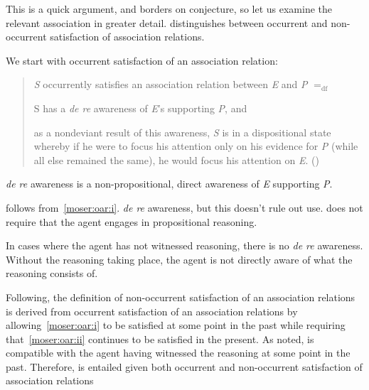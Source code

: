 \begin{note}
  This is a quick argument, and borders on conjecture, so let us examine the relevant association in greater detail.
  \citeauthor{Moser:1989tv} distinguishes between occurrent and non-occurrent satisfaction of association relations.

  We start with occurrent satisfaction of an association relation:
  \begin{quote}
    \emph{S} occurrently satisfies an association relation between \emph{E} and \emph{P} \(=_{\text{df}}\)
    \begin{enumerate*}[label=(\roman*), ref=(\roman*)]
    \item\label{moser:oar:i} S has a \emph{de re} awareness of \emph{E}'s supporting \emph{P}, and
    \item\label{moser:oar:ii} as a nondeviant result of this awareness, \emph{S} is in a dispositional state whereby if he were to focus his attention only on his evidence for \emph{P} (while all else remained the same), he would focus his attention on \emph{E}.\newline
    \mbox{}\hfill\mbox{(\Citeyear[141--142]{Moser:1989tv})}
    \end{enumerate*}
  \end{quote}

  \emph{de re} awareness is a non-propositional, direct awareness of \emph{E} supporting \emph{P}.

  \ESU{} follows from~\ref{moser:oar:i}.
  \emph{de re} awareness, but this doesn't rule out use.
  \ESU{} does not require that the agent engages in propositional reasoning.

  In cases where the agent has not witnessed reasoning, there is no \emph{de re} awareness.
  Without the reasoning taking place, the agent is not directly aware of what the reasoning consists of.

  Following, the definition of non-occurrent satisfaction of an association relations is derived from occurrent satisfaction of an association relations by allowing~\ref{moser:oar:i} to be satisfied at some point in the past while requiring that~\ref{moser:oar:ii} continues to be satisfied in the present.
  As noted, \ESU{} is compatible with the agent having witnessed the reasoning at some point in the past.
  Therefore, \ESU{} is entailed given both occurrent and non-occurrent satisfaction of association relations
\end{note}

